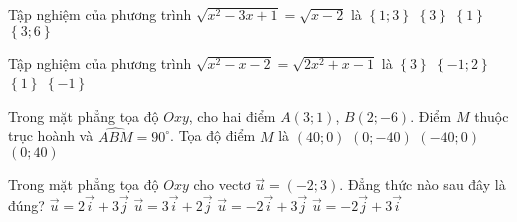 \begin{ex}%
	Tập nghiệm của phương trình $\sqrt{x^2-3 x+1}=\sqrt{x-2}$ là
	\choice
	{$\left\{1;3\right\}$}
	{\True $\left\{3\right\}$}
	{$\left\{1\right\}$}
	{$\left\{3;6\right\}$}
\end{ex}   
  
\begin{ex}%
	Tập nghiệm của phương trình $\sqrt{x^2-x-2}=\sqrt{2x^2+x-1}$ là
	\choice
	{$\left\{3\right\}$}
	{$\left\{-1;2\right\}$}
	{$\left\{1\right\}$}
	{\True $\left\{-1\right\}$}
\end{ex}    

\begin{ex}%
	Trong mặt phẳng tọa độ $Oxy$, cho hai điểm $A\left(3;1\right)$, $B\left(2;-6\right)$. Điểm $M$ thuộc trục hoành và $\widehat{ABM}=90^\circ$. Tọa độ điểm $M$ là 
	\choice
	{$(40;0)$}
	{$(0 ;-40)$}
	{\True $(-40 ; 0)$}
	{$(0 ; 40)$}
\end{ex}   
  
\begin{ex}%
	Trong mặt phẳng tọa độ $Oxy$ cho vectơ $\overrightarrow{u}=(-2;3)$. Đẳng thức nào sau đây là đúng?
	\choice
	{$\overrightarrow{u}=2 \overrightarrow{i}+3 \overrightarrow{j}$}
	{$\overrightarrow{u}=3 \overrightarrow{i}+2 \overrightarrow{j}$}
	{\True $\overrightarrow{u}=-2 \overrightarrow{i}+3 \overrightarrow{j}$}
	{$\overrightarrow{u}=-2 \overrightarrow{j}+3 \overrightarrow{i}$}
	\end{ex}

